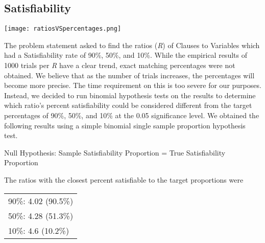 \documentclass{eptcs}
\begin{document}
\subsection{Satisfiability}
\begin{center}
	\texttt{[image: ratiosVSpercentages.png]}
\end{center}
The problem statement asked to find the ratios (\textit{R}) of Clauses to Variables which had a Satisfiability rate of 90\%, 50\%, and 10\%. While the empirical results of 1000 trials per \textit{R} have a clear trend, exact matching percentages were not obtained. We believe that as the number of trials increases, the percentages will become more precise. The time requirement on this is too severe for our purposes. Instead, we decided to run binomial hypothesis tests on the results to determine which ratio's percent satisfiability could be considered different from the target percentages of 90\%, 50\%, and 10\% at the 0.05 significance level. We obtained the following results using a simple binomial single sample proportion hypothesis test.\\
\newpage{}
\begin{center}
	Null Hypothesis: Sample Satisfiability Proportion = True Satisfiability Proportion
\end{center}
The ratios with the closest percent satisfiable to the target proportions were
\begin{center}
	\begin{tabular}{l}
	90\%: 4.02 (90.5\%)\\
	50\%: 4.28 (51.3\%)\\
	10\%: 4.6 (10.2\%)
	\end{tabular}
\end{center}
\end{document}
